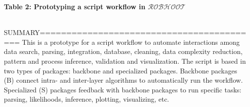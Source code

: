 \documentclass[english,12pt]{article}
\begin{document}
\begin{mybox}\begin{singlespace}
 {\bf{Table 2: Prototyping a script workflow in $\mathcal{ROBHOOT}$}}\\
 \begin{small}
   \\
   SUMMARY==========================================
   This is a prototype for a script workflow to automate interactions among data search, parsing, integration, database, cleaning, data complexity reduction, pattern and process inference, validation and visualization. The script is based in two types of packages: backbone and specialized packages. Backbone packages (B) connect intra- and inter-layer algorithms to automatically run the workflow. Specialized (S) packages feedback with backbone packages to run specific tasks: parsing, likelihoods, inference, plotting, visualizing, etc. \\


\end{small}
\end{singlespace}
\end{mybox}
\end{document}
